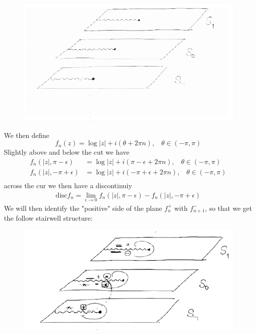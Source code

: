 \documentclass[a4paper,12pt]{article}
\begin{document}
\begin{figure}[H]
	\centering
	\includegraphics[width=0.9\linewidth]{14}
	\caption{}
	\label{fig:4}
\end{figure}
We then define
\begin{equation}
f_n(z)=\log |z|+i(\theta +2\pi n),~~~~\theta\in (-\pi,\pi)
\end{equation}
Slightly above and below the cut we have
\begin{equation}
\begin{aligned}
	f_n(|z|,\pi-\epsilon)&=\log |z|+i(\pi-\epsilon +2\pi n),~~~~\theta\in (-\pi,\pi)\\
		f_n(|z|,-\pi+\epsilon)&=\log |z|+i(-\pi+\epsilon +2\pi n),~~~~\theta\in (-\pi,\pi)\\
\end{aligned}
\end{equation}
across the cur we then have a discontinuiy
\begin{equation}
	\begin{aligned}
		\text{disc} f_n= \lim_{\epsilon\to 0}f_n(|z|,\pi-\epsilon)-f_n(|z|,-\pi+\epsilon)
		\end{aligned}
\end{equation}
We will then identify the "positive" side of the plane $f_{n}^+$ with $f_{n+1}^-$, so that we get the follow stairwell structure:
\begin{figure}[H]
	\centering
	\includegraphics[width=0.9\linewidth]{15}
	\caption{}
	\label{fig:4}
\end{figure}
\end{document}
